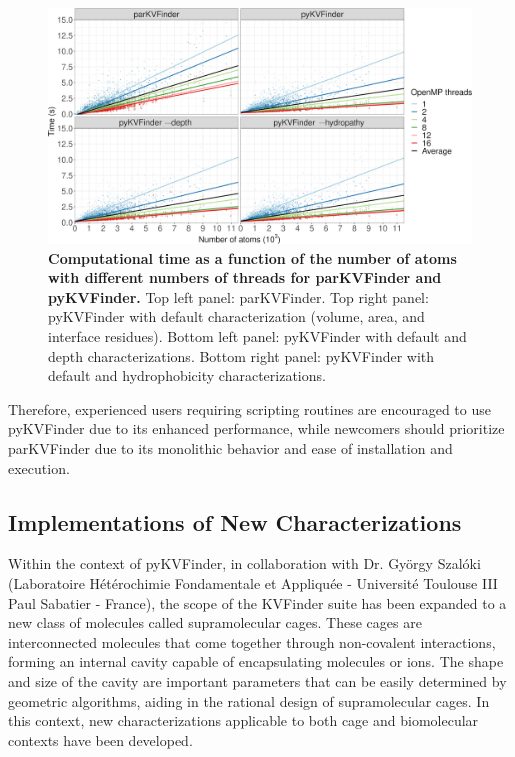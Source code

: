 \documentclass[Ingles]{phdthesis}
\begin{document}
\begin{figure}[h]
  \centering
  \includegraphics[scale=1]{images/pykvfinder-parkvfinder-kv1000-comparison.png}
  \caption[Computational time as a function of the number of atoms with different numbers of threads for parKVFinder and pyKVFinder]{\textbf{Computational time as a function of the number of atoms with different numbers of threads for parKVFinder and pyKVFinder.} Top left panel: parKVFinder. Top right panel: pyKVFinder with default characterization (volume, area, and interface residues). Bottom left panel: pyKVFinder with default and depth characterizations. Bottom right panel: pyKVFinder with default and hydrophobicity characterizations.}
  \label{fig:pykvfinder-parkvfinder-kv1000-comparison}
\end{figure}

Therefore, experienced users requiring scripting routines are encouraged to use pyKVFinder due to its enhanced performance, while newcomers should prioritize parKVFinder due to its monolithic behavior and ease of installation and execution. 

\subsection{Implementations of New Characterizations}

Within the context of pyKVFinder, in collaboration with Dr. György Szalóki (Laboratoire Hétérochimie Fondamentale et Appliquée - Université Toulouse III Paul Sabatier - France), the scope of the KVFinder suite has been expanded to a new class of molecules called supramolecular cages. These cages are interconnected molecules that come together through non-covalent interactions, forming an internal cavity capable of encapsulating molecules or ions. The shape and size of the cavity are important parameters that can be easily determined by geometric algorithms, aiding in the rational design of supramolecular cages. In this context, new characterizations applicable to both cage and biomolecular contexts have been developed.
\end{document}
